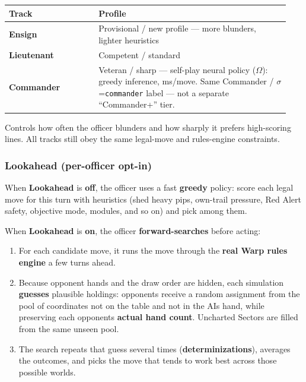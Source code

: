 \documentclass[11pt]{article}
\providecommand{\tightlist}{%
  \setlength{\itemsep}{0pt}\setlength{\parskip}{0pt}}
\begin{document}
\begin{longtable}[]{@{}>{\raggedright\arraybackslash}p{0.30\linewidth}>{\raggedright\arraybackslash}p{0.64\linewidth}@{}}
\toprule\noalign{}
Track & Profile \\
\midrule\noalign{}
\endhead
\bottomrule\noalign{}
\endlastfoot
\textbf{Ensign} & Provisional / new profile --- more blunders, lighter
heuristics \\
\textbf{Lieutenant} & Competent / standard \\
\textbf{Commander} & Veteran / sharp --- self-play neural policy ($\Omega$):
greedy inference, ms/move. Same Commander / $\sigma$=\texttt{commander} label
--- not a separate ``Commander+'' tier. \\
\end{longtable}

Controls how often the officer blunders and how sharply it prefers
high-scoring lines. All tracks still obey the same legal-move and
rules-engine constraints.

\subsubsection{Lookahead (per-officer
opt-in)}\label{lookahead-per-officer-opt-in}

When \textbf{Lookahead} is \textbf{off}, the officer uses a fast
\textbf{greedy} policy: score each legal move for this turn with
heuristics (shed heavy pips, own-trail pressure, Red Alert safety,
objective mode, modules, and so on) and pick among them.

When \textbf{Lookahead} is \textbf{on}, the officer
\textbf{forward-searches} before acting:

\begin{enumerate}
\def\labelenumi{\arabic{enumi}.}
\tightlist
\item
  For each candidate move, it runs the move through the \textbf{real
  Warp rules engine} a few turns ahead.
\item
  Because opponent hands and the draw order are hidden, each simulation
  \textbf{guesses} plausible holdings: opponents receive a random
  assignment from the pool of coordinates not on the table and not in the
  AI\textquotesingle s hand, while preserving each
  opponent\textquotesingle s \textbf{actual hand count}. Uncharted
  Sectors are filled from the same unseen pool.
\item
  The search repeats that guess several times
  (\textbf{determinizations}), averages the outcomes, and picks the move
  that tends to work best across those possible worlds.
\end{enumerate}
\end{document}
